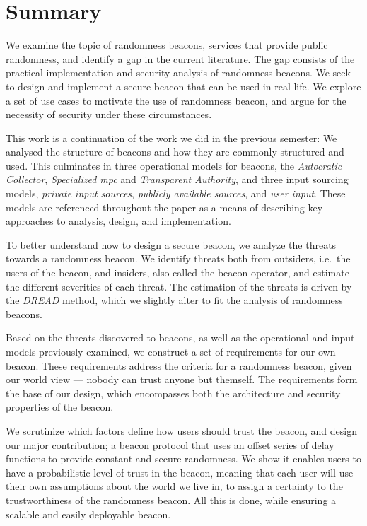 \section*{Summary}
We examine the topic of randomness beacons, services that provide public randomness, and identify a gap in the current literature.
The gap consists of the practical implementation and security analysis of randomness beacons.
We seek to design and implement a secure beacon that can be used in real life.
We explore a set of use cases to motivate the use of randomness beacon, and argue for the necessity of security under these circumstances.

This work is a continuation of the work we did in the previous semester: We analysed the structure of beacons and how they are commonly structured and used.
This culminates in three operational models for beacons, the \emph{Autocratic Collector}, \emph{Specialized \acrshort{mpc}} and \emph{Transparent Authority}, and three input sourcing models, \emph{private input sources}, \emph{publicly available sources}, and \emph{user input}.
These models are referenced throughout the paper as a means of describing key approaches to analysis, design, and implementation.

\bigskip\noindent
To better understand how to design a secure beacon, we analyze the threats towards a randomness beacon.
We identify threats both from outsiders, i.e.\ the users of the beacon, and insiders, also called the beacon operator, and estimate the different severities of each threat.
The estimation of the threats is driven by the \emph{DREAD} method, which we slightly alter to fit the analysis of randomness beacons.

Based on the threats discovered to beacons, as well as the operational and input models previously examined, we construct a set of requirements for our own beacon.
These requirements address the criteria for a randomness beacon, given our world view --- nobody can trust anyone but themself.
The requirements form the base of our design, which encompasses both the architecture and security properties of the beacon.

\bigskip\noindent
We scrutinize which factors define how users should trust the beacon, and design our major contribution; a beacon protocol that uses an offset series  of delay functions to provide constant and secure randomness.
We show it enables users to have a probabilistic level of trust in the beacon, meaning that each user will use their own assumptions about the world we live in, to assign a certainty to the trustworthiness of the randomness beacon.
All this is done, while ensuring a scalable and easily deployable beacon.

